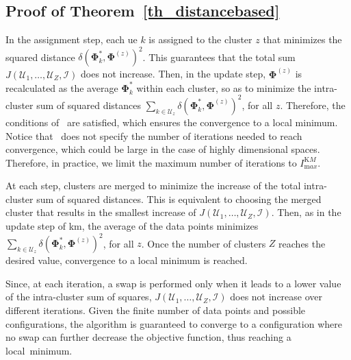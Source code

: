 \subsection*{Proof of Theorem~\ref{th_distancebased}}
\begin{IEEEproof}
    In the assignment step, each \gls{ue} $k$ is assigned to the cluster $z$ that minimizes the squared distance $\delta\left(\bm{\Phi}_k^*, \bm{\Phi}^{(z)}\right)^2$. This guarantees that the total sum $J(\mathcal{U}_1,\ldots,\mathcal{U}_{Z},\mathcal{I})$ does not increase. 
    Then, in the update step, $\bm{\Phi}^{(z)}$ is recalculated as the average $\bm{\Phi}_k^*$ within each cluster, so as to minimize the intra-cluster sum of squared distances $\sum_{k \in \mathcal{U}_z}\delta\left(\bm{\Phi}_k^*, \bm{\Phi}^{(z)}\right)^2$, for all $z$.
    Therefore, the conditions of~\cite[Lemma 5]{Sabin1986Global} are satisfied, which ensures the convergence to a local minimum. Notice that~\cite{Sabin1986Global} does not specify the number of iterations needed to reach convergence, which could be large in the case of highly dimensional spaces. Therefore, in practice, we limit the maximum number of iterations to $I_{\mathrm max}^{\mathrm KM}$.
\end{IEEEproof}
\begin{IEEEproof}
    At each step, clusters are merged to minimize the increase of the total intra-cluster sum of squared distances. This is equivalent to choosing the merged cluster that results in the smallest increase of $J(\mathcal{U}_1,\ldots,\mathcal{U}_{Z},\mathcal{I})$.
    Then, as in the update step of \gls{km}, the average of the data points minimizes $\sum_{k \in \mathcal{U}_z}\delta\left(\bm{\Phi}_k^*, \bm{\Phi}^{(z)}\right)^2$, for all $z$. Once the number of clusters $Z$ reaches the desired value, convergence to a local minimum is reached.
\end{IEEEproof}
\begin{IEEEproof}
    Since, at each iteration, a swap is performed only when it leads to a lower value of the intra-cluster sum of squares, $J(\mathcal{U}_1,\ldots,\mathcal{U}_{Z},\mathcal{I})$ does not increase over different iterations. Given the finite number of data points and possible configurations, the algorithm is guaranteed to converge to a configuration where no swap can further decrease the objective function, thus reaching a local~minimum.
\end{IEEEproof}